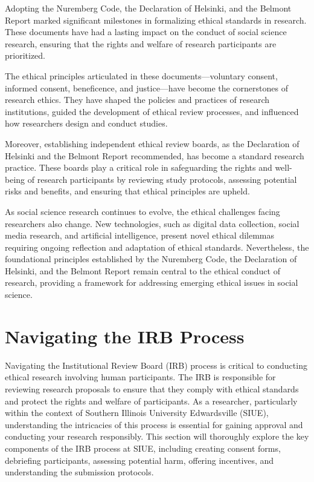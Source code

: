 \documentclass[
]{book}
\begin{document}
Adopting the Nuremberg Code, the Declaration of Helsinki, and the Belmont Report marked significant milestones in formalizing ethical standards in research. These documents have had a lasting impact on the conduct of social science research, ensuring that the rights and welfare of research participants are prioritized.

The ethical principles articulated in these documents---voluntary consent, informed consent, beneficence, and justice---have become the cornerstones of research ethics. They have shaped the policies and practices of research institutions, guided the development of ethical review processes, and influenced how researchers design and conduct studies.

Moreover, establishing independent ethical review boards, as the Declaration of Helsinki and the Belmont Report recommended, has become a standard research practice. These boards play a critical role in safeguarding the rights and well-being of research participants by reviewing study protocols, assessing potential risks and benefits, and ensuring that ethical principles are upheld.

As social science research continues to evolve, the ethical challenges facing researchers also change. New technologies, such as digital data collection, social media research, and artificial intelligence, present novel ethical dilemmas requiring ongoing reflection and adaptation of ethical standards. Nevertheless, the foundational principles established by the Nuremberg Code, the Declaration of Helsinki, and the Belmont Report remain central to the ethical conduct of research, providing a framework for addressing emerging ethical issues in social science.

\section{Navigating the IRB Process}\label{navigating-the-irb-process}

Navigating the Institutional Review Board (IRB) process is critical to conducting ethical research involving human participants. The IRB is responsible for reviewing research proposals to ensure that they comply with ethical standards and protect the rights and welfare of participants. As a researcher, particularly within the context of Southern Illinois University Edwardsville (SIUE), understanding the intricacies of this process is essential for gaining approval and conducting your research responsibly. This section will thoroughly explore the key components of the IRB process at SIUE, including creating consent forms, debriefing participants, assessing potential harm, offering incentives, and understanding the submission protocols.
\end{document}
